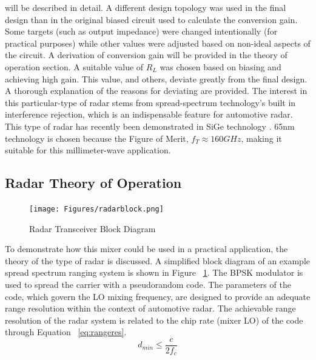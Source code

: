 \documentclass{article}                                                         %
\begin{document}
will be described in detail. A different design topology was used in the final design than in the original biased circuit used to calculate
the conversion gain. Some targets (such as output impedance) were changed intentionally (for practical purposes) while other values
were adjusted based on non-ideal aspects of the circuit.\vspace{3mm}
A derivation of conversion gain will be provided in the theory of operation section. A suitable value of $R_L$ was chosen
based on biasing and achieving high gain. This value, and others, deviate greatly from the final design. A thorough explanation of the
reasons for deviating are provided.
The interest in this particular-type of radar stems from spread-spectrum technology's built in interference rejection, which
is an indispensable feature for automotive radar. This type of radar has recently been demonstrated in
SiGe technology \cite{trotta200779ghz, ng2014fully}. 65nm technology is chosen because the Figure of Merit, $f_T \approx 160GHz $, making it suitable for
this millimeter-wave application.

\subsection{Radar Theory of Operation}

\begin{figure}
  \begin{center}
    \texttt{[image: Figures/radarblock.png]}
    \caption{Radar Transceiver Block Diagram}
    \label{fig:radartrans}
  \end{center}
\end{figure}
To demonstrate how this mixer could be used in a practical application, the theory of the type of radar is discussed.
A simplified block diagram of an example spread spectrum ranging system is shown in Figure ~\ref{fig:radartrans}.
The BPSK modulator is used to spread the carrier with a pseudorandom code. The parameters of the code, which govern
the LO mixing frequency, are designed to provide an adequate range resolution within the context of automotive radar.
The achievable range resolution of the radar system is related to the chip rate (mixer LO) of the code through
Equation ~\ref{eq:rangeres}.\\

\begin{equation}
  \label{eq:rangeres}
  d_{min} \leq \dfrac{c}{2f_c}
\end{equation}
\end{document}
